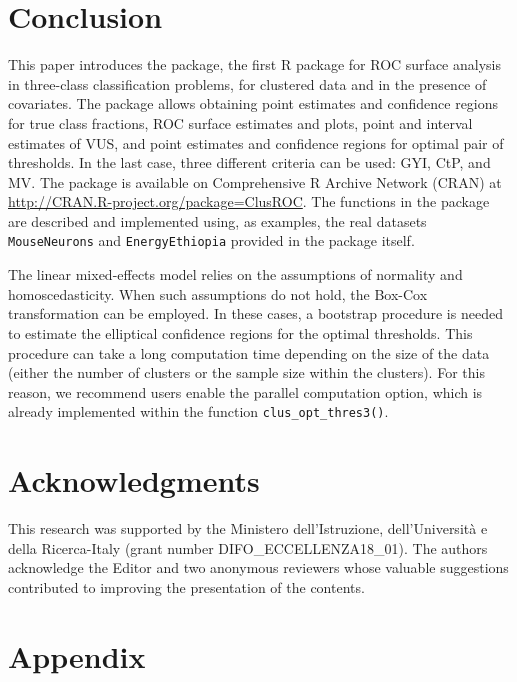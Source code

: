 \hypertarget{conclusion}{%
\section{Conclusion}\label{conclusion}}
This paper introduces the  package, the first R package for ROC surface analysis in three-class classification problems, for clustered data and in the presence of covariates. The package allows obtaining point estimates and confidence regions for true class fractions, ROC surface estimates and plots, point and interval estimates of VUS, and point estimates and confidence regions for optimal pair of thresholds. In the last case, three different criteria can be used: GYI, CtP, and MV. The package is available on Comprehensive R Archive Network (CRAN) at \url{http://CRAN.R-project.org/package=ClusROC}. The functions in the package are described and implemented using, as examples, the real datasets \texttt{MouseNeurons} and \texttt{EnergyEthiopia} provided in the package itself. 

The linear mixed-effects model relies on the assumptions of normality and homoscedasticity. When such assumptions do not hold, the Box-Cox transformation can be employed.  In these cases, a bootstrap procedure is needed to estimate the elliptical confidence regions for the optimal thresholds. This procedure can take a long computation time depending on the size of the data (either the number of clusters or the sample size within the clusters). For this reason, we recommend users enable the parallel computation option, which is already implemented within the function \texttt{clus\_opt\_thres3()}.


\hypertarget{acknowledgments}{%
\section{Acknowledgments}\label{acknowledgments}}
This research was supported by the Ministero dell'Istruzione, dell'Università e della Ricerca-Italy (grant number DIFO\_ECCELLENZA18\_01). The authors acknowledge the Editor and two anonymous reviewers whose valuable suggestions contributed to improving the presentation of the contents.



\hypertarget{appendix}{%
\section{Appendix}\label{appendix}}

